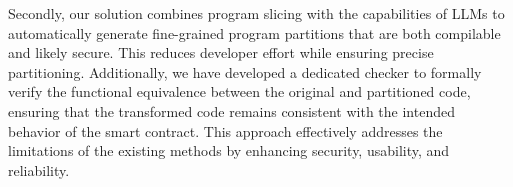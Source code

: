 Secondly, our solution combines program slicing with the capabilities of LLMs to automatically 
generate fine-grained program partitions that are both compilable and likely secure. 
This reduces developer effort while ensuring precise partitioning. 
Additionally, we have developed a dedicated checker to formally verify the functional equivalence between the original and partitioned code, ensuring that the transformed code remains consistent with the intended behavior of the smart contract. 
This approach effectively addresses the limitations of the existing methods by enhancing security, usability, and reliability. 

